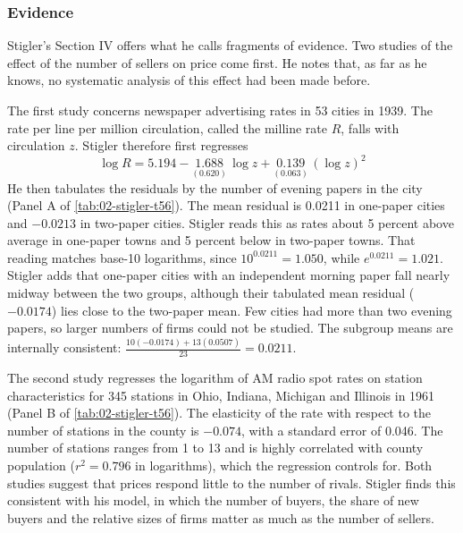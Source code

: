 \subsubsection{Evidence}

Stigler's Section IV offers what he calls fragments of evidence. Two studies of the effect of the number of sellers
on price come first. He notes that, as far as he knows, no systematic analysis of this effect had been made
before.

The first study concerns newspaper advertising rates in 53 cities in 1939. The rate per line per million
circulation, called the milline rate $R$, falls with circulation $z$. Stigler therefore first regresses
\begin{equation*}
\log R = 5.194 - \underset{(0.620)}{1.688}\,\log z + \underset{(0.063)}{0.139}\,(\log z)^2
\end{equation*}
He then tabulates the residuals by the number of evening papers in the city (Panel A of
\cref{tab:02-stigler-t56}). The mean residual is 0.0211 in one-paper cities and $-0.0213$ in two-paper cities.
Stigler reads this as rates about 5 percent above average in one-paper towns and 5 percent below in two-paper
towns. That reading matches base-10 logarithms, since $10^{0.0211} = 1.050$, while $e^{0.0211} = 1.021$.
Stigler adds that one-paper cities with an independent morning paper fall nearly midway between the two groups,
although their tabulated mean residual ($-0.0174$) lies close to the two-paper mean. Few cities had
more than two evening papers, so larger numbers of firms could not be studied. The subgroup means are internally
consistent: $\frac{10(-0.0174) + 13(0.0507)}{23} = 0.0211$.

The second study regresses the logarithm of AM radio spot rates on station characteristics for 345 stations in
Ohio, Indiana, Michigan and Illinois in 1961 (Panel B of \cref{tab:02-stigler-t56}). The elasticity of the rate with
respect to the number of stations in the county is $-0.074$, with a standard error of 0.046. The number of stations
ranges from 1 to 13 and is highly correlated with county population ($r^2 = 0.796$ in logarithms), which the
regression controls for. Both studies suggest that prices respond little to the number of rivals. Stigler finds this
consistent with his model, in which the number of buyers, the share of new buyers and the relative sizes of firms
matter as much as the number of sellers.


